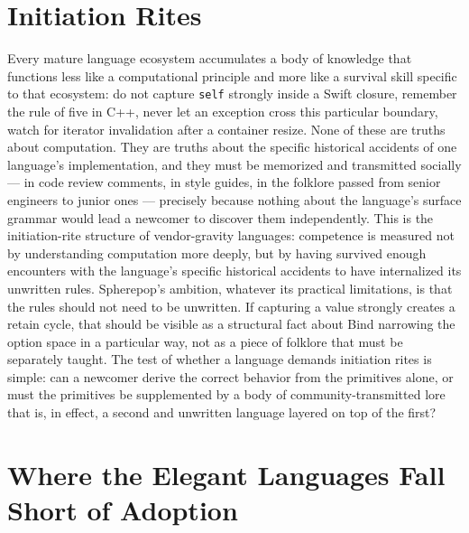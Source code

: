 \documentclass[11pt]{article}
\begin{document}
\section{Initiation Rites}

Every mature language ecosystem accumulates a body of knowledge that functions less like a computational principle and more like a survival skill specific to that ecosystem: do not capture \texttt{self} strongly inside a Swift closure, remember the rule of five in C++, never let an exception cross this particular boundary, watch for iterator invalidation after a container resize. None of these are truths about computation. They are truths about the specific historical accidents of one language's implementation, and they must be memorized and transmitted socially --- in code review comments, in style guides, in the folklore passed from senior engineers to junior ones --- precisely because nothing about the language's surface grammar would lead a newcomer to discover them independently. This is the initiation-rite structure of vendor-gravity languages: competence is measured not by understanding computation more deeply, but by having survived enough encounters with the language's specific historical accidents to have internalized its unwritten rules. Spherepop's ambition, whatever its practical limitations, is that the rules should not need to be unwritten. If capturing a value strongly creates a retain cycle, that should be visible as a structural fact about Bind narrowing the option space in a particular way, not as a piece of folklore that must be separately taught. The test of whether a language demands initiation rites is simple: can a newcomer derive the correct behavior from the primitives alone, or must the primitives be supplemented by a body of community-transmitted lore that is, in effect, a second and unwritten language layered on top of the first?

\section{Where the Elegant Languages Fall Short of Adoption}
\end{document}
